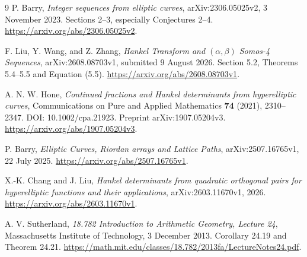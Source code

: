 \documentclass[11pt,letterpaper]{article}
\numberwithin{equation}{section}
\theoremstyle{definition}
\theoremstyle{remark}
\begin{document}
\begin{thebibliography}{9}
P. Barry,
\emph{Integer sequences from elliptic curves},
arXiv:2306.05025v2, 3 November 2023.
Sections 2--3, especially Conjectures 2--4.
\url{https://arxiv.org/abs/2306.05025v2}.

F. Liu, Y. Wang, and Z. Zhang,
\emph{Hankel Transform and $(\alpha,\beta)$ Somos-4 Sequences},
arXiv:2608.08703v1, submitted 9 August 2026.
Section 5.2, Theorems 5.4--5.5 and Equation (5.5).
\url{https://arxiv.org/abs/2608.08703v1}.

A. N. W. Hone,
\emph{Continued fractions and Hankel determinants from hyperelliptic curves},
Communications on Pure and Applied Mathematics \textbf{74} (2021),
2310--2347. DOI: 10.1002/cpa.21923.
Preprint arXiv:1907.05204v3.
\url{https://arxiv.org/abs/1907.05204v3}.

P. Barry,
\emph{Elliptic Curves, Riordan arrays and Lattice Paths},
arXiv:2507.16765v1, 22 July 2025.
\url{https://arxiv.org/abs/2507.16765v1}.

X.-K. Chang and J. Liu,
\emph{Hankel determinants from quadratic orthogonal pairs for hyperelliptic
functions and their applications},
arXiv:2603.11670v1, 2026.
\url{https://arxiv.org/abs/2603.11670v1}.

A. V. Sutherland,
\emph{18.782 Introduction to Arithmetic Geometry, Lecture 24},
Massachusetts Institute of Technology, 3 December 2013.
Corollary 24.19 and Theorem 24.21.
\url{https://math.mit.edu/classes/18.782/2013fa/LectureNotes24.pdf}.
\end{thebibliography}
\end{document}
